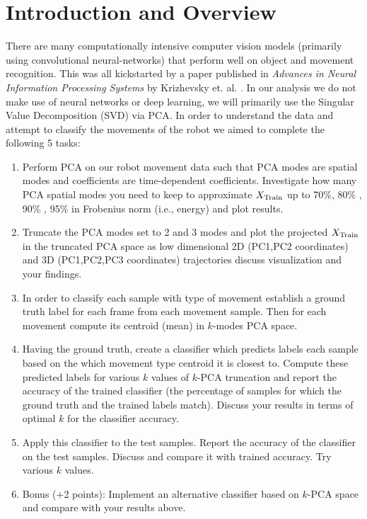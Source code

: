\documentclass[11pt]{amsart}
\begin{document}
\section{Introduction and Overview}\label{sec:Introduction}
There are many computationally intensive computer vision models (primarily using convolutional neural-networks) that perform well on object and movement recognition.
This was all kickstarted by a paper published in \textit{Advances in Neural Information Processing Systems} by Krizhevsky et. al.  \cite{NIPS2012_c399862d}.
In our analysis we do not make use of neural networks or deep learning, we will primarily use the Singular Value Decomposition (SVD) via PCA.
In order to understand the data and attempt to classify the movements of the robot we aimed to complete the following 5 tasks: \\
\begin{enumerate}

\item Perform PCA on our robot movement data such that PCA modes are spatial modes and coefficients are time-dependent coefficients.
Investigate how many PCA spatial modes you need to keep to approximate $X_{\rm Train}$ up to 70\%, 80\% , 90\% , 95\% in Frobenius norm (i.e., energy) and plot results. \\

\item Truncate the PCA modes set to 2 and 3 modes and plot the projected $X_{\rm Train}$ in the truncated PCA space as low dimensional 2D (PC1,PC2 coordinates) and 3D (PC1,PC2,PC3 coordinates) trajectories discuss visualization and your findings. \\

\item In order to classify each sample with type of movement establish a ground truth label for each frame from each movement sample.
Then for each movement compute its centroid (mean) in $k$-modes PCA space. \\

\item Having the ground truth, create a classifier which predicts labels each sample based on the which movement type centroid it is closest to.
Compute these predicted labels for various $k$ values of $k$-PCA truncation and report the accuracy of the trained classifier (the percentage of samples for which the ground truth and the trained labels match).
Discuss your results in terms of optimal $k$ for the classifier accuracy. \\

\item Apply this classifier to the test samples.
Report the accuracy of the classifier on the test samples.
Discuss and compare it with trained accuracy.
Try various $k$ values. \\

\item Bonus (+2 points): Implement an alternative classifier based on $k$-PCA space and compare with your
results above. \\

\end{enumerate}
\end{document}
